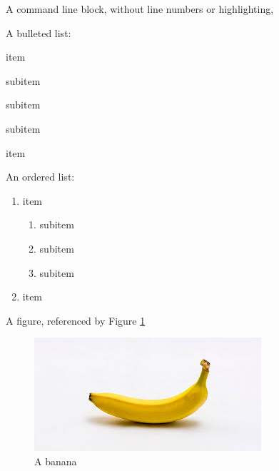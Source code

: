 \documentclass[a4paper, ]{article}
\begin{document}
    A command line block, without line numbers or highlighting,


    A bulleted list:

    \begin{deepitemize}
        \item item
        \begin{deepitemize}
            \item subitem
            \item subitem
            \item subitem
        \end{deepitemize}
        \item item
    \end{deepitemize}

    An ordered list:

    \begin{enumerate}
        \item item
        \begin{enumerate}
            \item subitem
            \item subitem
            \item subitem
        \end{enumerate}
        \item item
    \end{enumerate}

    A figure, referenced by Figure \ref{fig:banana}

    \begin{figure}[H]
        \centering
        \includegraphics[scale=1.0]{banana.jpg}
        \caption{A banana}
        \label{fig:banana}
    \end{figure}
\end{document}
